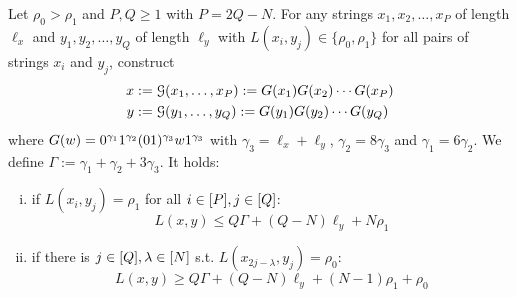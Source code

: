 \begin{lemma}
\label{lem:1-2vs1gadget}
Let $\rho_0 > \rho_1$ and $P, Q \geq 1$ with $P = 2Q - N$.
For any strings $x_1, x_2, \ldots, x_P$ of length $\ell_x$ and $y_1, y_2, \ldots, y_Q$ of length $\ell_y$ with $L(x_i, y_j) \in \{\rho_0, \rho_1\}$ for all pairs of strings $x_i$ and $y_j$, construct
\begin{align*}
	x &:= \mathcal{G}(x_1, \ldots, x_P) := G(x_1)G(x_2) \cdots G(x_P)\\
	y &:= \mathcal{G}(y_1, \ldots, y_Q) := G(y_1)G(y_2) \cdots G(y_Q)
\end{align*}
where $G(w) = 0^{\gamma_1}1^{\gamma_2}(01)^{\gamma_3}w1^{\gamma_3}$ with $\gamma_3 = \ell_x + \ell_y$, $\gamma_2 = 8\gamma_3$ and $\gamma_1 = 6\gamma_2$.
We define $\Gamma := \gamma_1 + \gamma_2 + 3\gamma_3$.
It holds:
%
\begin{enumerate}[(i)]
\item\label{lem:1-2vs1gadget:not-ortho} if $L(x_i, y_j) = \rho_1$ for all $i \in [P], j \in [Q]$: 
\[ 
L(x,y) \leq Q\Gamma + (Q-N)\ell_y + N\rho_1
\]
\item\label{lem:1-2vs1gadget:ortho} if there is $j \in [Q], \lambda \in [N]$ s.t. $L(x_{2j-\lambda}, y_j) = \rho_0$: 
\[
L(x,y) \geq Q\Gamma + (Q-N)\ell_y + (N-1)\rho_1 + \rho_0
\]


\end{enumerate}
%

\end{lemma}


